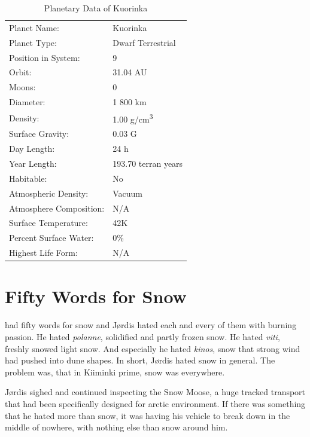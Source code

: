\documentclass{tufte-book}
\begin{document}
\bigskip
\begin{table}
\begin{minipage}{\textwidth}
\begin{center}
\begin{tabular}{ll}
\toprule
Planet Name: & Kuorinka \\
Planet Type: & Dwarf Terrestrial \\
Position in System: & 9 \\
Orbit: & 31.04 AU \\
Moons: & 0 \\
Diameter: & 1 800 km \\
Density: & 1.00 g/cm\textsuperscript{3} \\
Surface Gravity: & 0.03 G \\
Day Length: & 24 h \\
Year Length: & 193.70 terran years \\
Habitable: & No \\
\quad Atmospheric Density: & Vacuum \\
\quad Atmosphere Composition: & N/A \\
\quad Surface Temperature: & 42K \\
\quad Percent Surface Water: & 0\% \\
\quad Highest Life Form: & N/A \\

\bottomrule
\end{tabular}
\end{center}
\end{minipage}
\caption{Planetary Data of Kuorinka}
\end{table}


\chapter{Fifty Words for Snow}

 had fifty words for snow and
J\o rdis hated each and every of them with burning passion. He hated
\emph{polanne}, solidified and partly frozen snow. He hated \emph{viti}, 
freshly snowed light snow. And especially he hated \emph{kinos}, snow 
that strong wind had pushed into dune shapes. In short, J\o rdis hated 
snow in general. The problem was, that in Kiiminki prime, snow was 
everywhere.

J\o rdis sighed and continued inspecting the Snow Moose, a huge
tracked transport that had been specifically designed for arctic
environment. If there was something that he hated more than snow, it
was having his vehicle to break down in the middle of nowhere, with
nothing else than snow around him.
\end{document}
